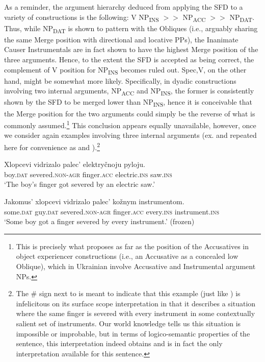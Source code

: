 \documentclass[output=paper,colorlinks,citecolor=brown]{langscibook}
\begin{document}
As a reminder, the argument hierarchy deduced from applying the SFD to a variety of constructions is the following: V NP\textsubscript{INS} $>>$ NP\textsubscript{ACC} $>>$ NP\textsubscript{DAT}. Thus, while NP\textsubscript{DAT} is shown to pattern with the Obliques (i.e., arguably sharing the same Merge position with directional and locative PPs), the Inanimate Causer Instrumentals are in fact shown to have the highest Merge position of the three arguments. Hence, to the extent the SFD is accepted as being correct, the complement of V position for NP\textsubscript{INS} becomes ruled out. Spec,V, on the other hand, might be somewhat more likely. Specifically, in dyadic constructions involving two internal arguments, NP\textsubscript{ACC} and NP\textsubscript{INS}, the former is consistently shown by the SFD to be merged lower than NP\textsubscript{INS}, hence it is conceivable that the Merge position for the two arguments could simply be the reverse of what is commonly assumed.\footnote{\textrm{This is precisely what \citet{Landau2010} proposes as far as the position of the Accusatives in object experiencer constructions (i.e., an Accusative as a concealed low Oblique), which in Ukrainian involve Accusative and Instrumental argument NPs.} } This conclusion appears equally unavailable, however, once we consider again examples involving three internal arguments (ex.  and  repeated here for convenience as  and ).\footnote{\textrm{The \# sign next to  is meant to indicate that this example (just like ) is infelicitous on its surface scope interpretation in that it describes a situation where the same finger is severed with every instrument in some contextually salient set of instruments. Our world knowledge tells us this situation is impossible or improbable, but in terms of logico-semantic properties of the sentence, this interpretation indeed obtains and is in fact the only interpretation available for this sentence.}}

\ea%
    \label{ex:antonyuk:29rep}
\gll            Xlopcevi   vidrizalo    palec’    elektryčnoju pyloju.\\
boy.\textsc{dat}   severed.\textsc{non-agr} finger.\textsc{acc} electric.\textsc{ins} saw.\textsc{ins}\\
\glt ‘The boy’s finger got severed by an electric saw.’
    \z


\ea%
    \label{ex:antonyuk:30rep}

\ea
\gll   Jakomus’ xlopcevi   vidrizalo    palec’    kožnym instrumentom.\\
some.\textsc{dat} guy.\textsc{dat} severed.\textsc{non-agr}  finger.\textsc{acc} every.\textsc{ins} instrument.\textsc{ins}\\
\glt ‘Some boy got a finger severed by every instrument.’    \hfill   (frozen)
\end{document}
